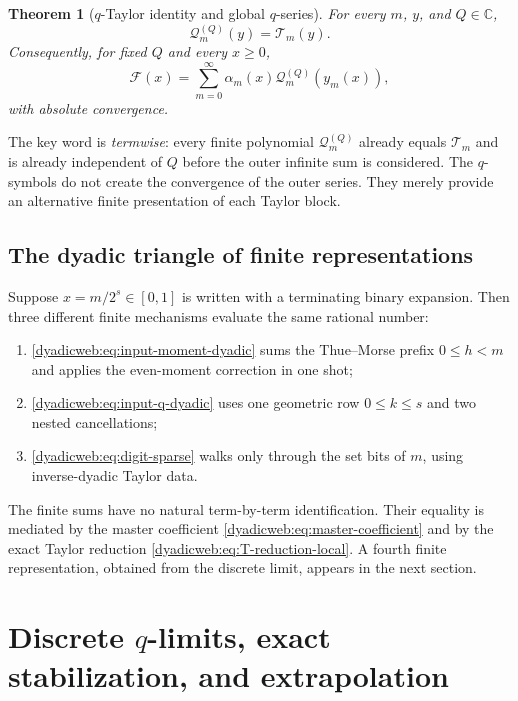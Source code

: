 \documentclass[11pt,oneside]{article}
\newtheorem{theorem}{Theorem}[section]
\theoremstyle{definition}
\theoremstyle{remark}
\newcommand{\C}{\mathbb C}
\begin{document}
\begin{theorem}[$q$-Taylor identity and global $q$-series]
\label{dyadicweb:thm:q-global-local}
For every $m$, $y$, and $Q\in\C$,
\begin{equation}
 \mathcal Q_m^{(Q)}(y)=\mathcal T_m(y).                   \label{dyadicweb:eq:Qm-equals-Tm-local}
\end{equation}
Consequently, for fixed $Q$ and every $x\ge0$,
\begin{equation}
 \boxed{
 \mathcal F(x)=\sum_{m=0}^{\infty}
 \alpha_m(x)\mathcal Q_m^{(Q)}(y_m(x)),}                 \label{dyadicweb:eq:global-q-series-local}
\end{equation}
with absolute convergence.
\end{theorem}

The key word is \emph{termwise}: every finite polynomial
$\mathcal Q_m^{(Q)}$ already equals $\mathcal T_m$ and is already independent of $Q$ before
the outer infinite sum is considered.  The $q$-symbols do not create the convergence of the
outer series.  They merely provide an alternative finite presentation of each Taylor block.

\subsection{The dyadic triangle of finite representations}

Suppose $x=m/2^s\in[0,1]$ is written with a terminating binary expansion.  Then three different
finite mechanisms evaluate the same rational number:
\begin{enumerate}
\item \eqref{dyadicweb:eq:input-moment-dyadic} sums the Thue--Morse prefix $0\le h<m$ and applies the
      even-moment correction in one shot;
\item \eqref{dyadicweb:eq:input-q-dyadic} uses one geometric row $0\le k\le s$ and two nested
      cancellations;
\item \eqref{dyadicweb:eq:digit-sparse} walks only through the set bits of $m$, using inverse-dyadic
      Taylor data.
\end{enumerate}
The finite sums have no natural term-by-term identification.  Their equality is mediated by
the master coefficient \eqref{dyadicweb:eq:master-coefficient} and by the exact Taylor reduction
\eqref{dyadicweb:eq:T-reduction-local}.  A fourth finite representation, obtained from the discrete
limit, appears in the next section.

\section[Discrete q-limits, exact stabilization, and extrapolation]{Discrete $q$-limits, exact stabilization, and extrapolation}
\label{dyadicweb:sec:discrete}
\end{document}

